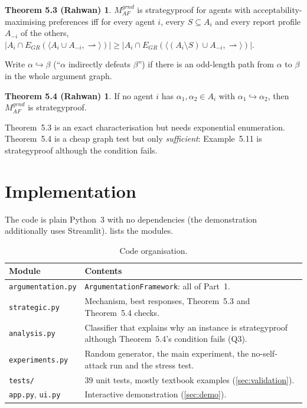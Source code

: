 \documentclass[11pt,a4paper]{article}
\newcommand{\att}{\rightharpoonup}
\newcommand{\odd}{\hookrightarrow}
\newcommand{\AF}{\mathit{AF}}
\newcommand{\Mgr}{M^{\mathit{grnd}}_{\AF}}
\newcommand{\EGR}{E_{\mathit{GR}}}
\newcommand{\code}[1]{{\let\origus\_\renewcommand{\_}{\origus\allowbreak}\texttt{#1}}}
\theoremstyle{definition}
\newtheorem*{thm53}{Theorem 5.3 (Rahwan)}
\newtheorem*{thm54}{Theorem 5.4 (Rahwan)}
\begin{document}
\begin{thm53}
$\Mgr$ is strategyproof for agents with acceptability-maximising preferences iff for every agent
$i$, every $S\subseteq A_i$ and every report profile $A_{-i}$ of the others,
$|A_i\cap\EGR(\langle A_i\cup A_{-i},\att\rangle)| \ge |A_i\cap\EGR(\langle (A_i\setminus S)\cup
A_{-i},\att\rangle)|$.
\end{thm53}

Write $\alpha\odd\beta$ (``$\alpha$ indirectly defeats $\beta$'') if there is an odd-length path from
$\alpha$ to $\beta$ in the whole argument graph.

\begin{thm54}
If no agent $i$ has $\alpha_1,\alpha_2\in A_i$ with $\alpha_1\odd\alpha_2$, then $\Mgr$ is
strategyproof.
\end{thm54}

Theorem~5.3 is an exact characterisation but needs exponential enumeration. Theorem~5.4 is a cheap
graph test but only \emph{sufficient}: Example~5.11 is strategyproof although the condition fails.

\section{Implementation}\label{sec:impl}

The code is plain Python~3 with no dependencies (the demonstration additionally uses Streamlit).
 lists the modules.

\begin{table}[H]
\centering\small
\begin{tabularx}{\textwidth}{@{}lX@{}}
\toprule
Module & Contents \\
\midrule
\code{argumentation.py} & \code{ArgumentationFramework}: all of Part~1. \\
\code{strategic.py} & Mechanism, best responses, Theorem~5.3 and Theorem~5.4 checks. \\
\code{analysis.py} & Classifier that explains why an instance is strategyproof although Theorem~5.4's condition fails (Q3). \\
\code{experiments.py} & Random generator, the main experiment, the no-self-attack run and the stress test. \\
\code{tests/} & 39 unit tests, mostly textbook examples (\cref{sec:validation}). \\
\code{app.py}, \code{ui.py} & Interactive demonstration (\cref{sec:demo}). \\
\bottomrule
\end{tabularx}
\caption{Code organisation.}\label{tab:modules}
\end{table}
\end{document}
